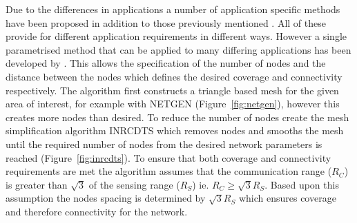 \documentclass[authoryearcitations]{UoYCSproject}
\begin{document}
Due to the differences in applications a number of application specific methods have been proposed in addition to those previously mentioned \citep{Meguerdichian2001,Meguerdichian2001a,Meguerdichian2003}. All of these provide for different application requirements in different ways. However a single parametrised method that can be applied to many differing applications has been developed by \citet*{Derr2013}. This allows the specification of the number of nodes and the distance between the nodes which defines the desired coverage and connectivity respectively. The algorithm first constructs a triangle based mesh for the given area of interest, for example with NETGEN (Figure~\ref{fig:netgen}), however this creates more nodes than desired. To reduce the number of nodes \citeauthor*{Derr2013} create the mesh simplification algorithm INRCDTS which removes nodes and smooths the mesh until the required number of nodes from the desired network parameters is reached (Figure~\ref{fig:inrcdts}). To ensure that both coverage and connectivity requirements are met the algorithm assumes that the communication range ($R_C$) is greater than $\sqrt{3}$ of the sensing range ($R_S$) ie. $R_C \ge \sqrt{3} R_S$. Based upon this assumption the nodes spacing is determined by $\sqrt{3} R_S$ which ensures coverage and therefore connectivity for the network.
\end{document}

